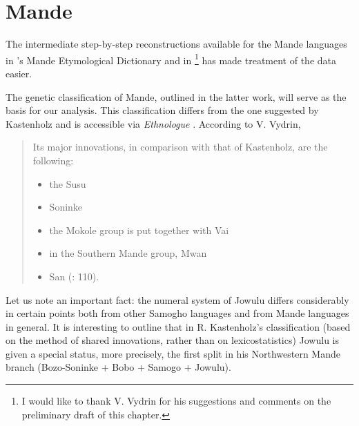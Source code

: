 \section{Mande}%

 The intermediate step-by-step reconstructions available for the Mande languages in \citeauthor{Vydrinms}’s Mande Etymological Dictionary  and in \citealt{Vydrin2007}\footnote{I would like to thank V. Vydrin for his suggestions and comments on the preliminary draft of this chapter.}  has made treatment of the data easier.

 The genetic classification of Mande, outlined in the latter work, will serve as the basis for our analysis. This classification differs from the one suggested by Kastenholz and is accessible via \textit{Ethnologue} \citep{SimonsFenning2018}. According to V. Vydrin, 
 
 \begin{quote}
 {Its major innovations, in comparison with that of Kastenholz, are the following:} 

 \begin{itemize} 
\item {the Susu}

\item { Soninke} 

\item { the Mokole group is put together with Vai} 

\item { in the Southern Mande group, Mwan} 

\item {San} {(}\citealt{Vydrin2016}: 110).
 \end{itemize}
 
 \end{quote}


Let us note an important fact: the numeral system of Jowulu  differs considerably in certain points both from other Samogho languages and from Mande languages in general. It is interesting to outline that in R. Kastenholz's classification (based on the method of shared innovations, rather than on lexicostatistics) Jowulu is given a special status, more precisely, the first split in his Northwestern Mande branch (Bozo-Soninke + Bobo + Samogo + Jowulu).

